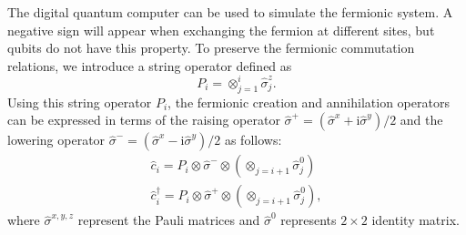 \documentclass[longbibliography, aps, prx, amsmath, amssymb, amsfonts, twocolumn,superscriptaddress, footinbib]{revtex4-1}
\begin{document}
	The digital quantum computer can be used to simulate the fermionic system. 
	A negative sign will appear when exchanging the fermion at different sites, but qubits do not have this property. 
	To preserve the fermionic commutation relations, we introduce a string operator defined as
	\begin{equation}
		P_i = \otimes_{j=1}^i\hat{\sigma}^z_j.
	\end{equation}
	Using this string operator $P_i$, the fermionic creation and annihilation operators can be expressed in terms of the raising operator $\hat{\sigma}^+=(\hat{\sigma}^x+\mathrm{i}\hat{\sigma}^y)/2$ and the lowering operator $\hat{\sigma}^-=(\hat{\sigma}^x-\mathrm{i}\hat{\sigma}^y)/2$ as follows:
	\begin{equation}
		\begin{split}
			\hat{c}_i = P_i \otimes \hat{\sigma}^{-}\otimes (\otimes_{j=i+1}\hat{\sigma}^0_j)\\
			\hat{c}_i^{\dagger} = P_i \otimes \hat{\sigma}^{+}\otimes (\otimes_{j=i+1}\hat{\sigma}^0_j),
		\end{split}
	\end{equation}
	where $\hat{\sigma}^{x,y,z}$ represent the Pauli matrices and $\hat{\sigma}^0$ represents $2\times 2$ identity matrix. 
	
\end{document}
